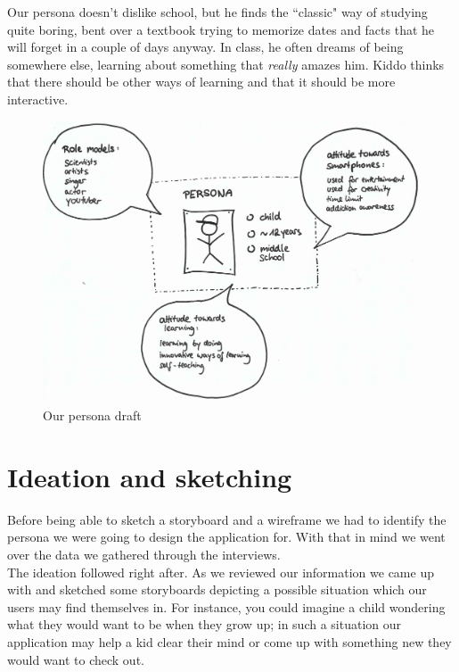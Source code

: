 \documentclass[12pt]{scrartcl}
\begin{document}
	Our persona doesn't dislike school, but he finds the ``classic" way of studying quite boring, bent over a textbook trying to memorize 
	dates and facts that he will forget in a couple of days anyway. In class, he often dreams of being somewhere else, learning 
	about something that \textit{really} amazes him. Kiddo thinks that there should be other ways of learning and that it should be
	more interactive.\\	
	
	\begin{figure}[H]
        		\centering
       		\includegraphics[width=\textwidth]{../images/persona2.jpg}
       		\caption{Our persona draft}
        		\label{persona1}
	\end{figure}
	

\section{Ideation and sketching}

	Before being able to sketch a storyboard and a wireframe we had to identify the persona we 
	were going to design the application for. With that in mind we went over the data we gathered
	through the interviews.\\
	
	The ideation followed right after. As we reviewed our information we came up with and sketched 
	some storyboards depicting a possible situation which our users may find themselves in. 
	For instance, you could imagine a child wondering what they would want to be when they grow
	up; in such a situation our application may help a kid clear their mind or come up with something
	new they would want to check out.\\
	
\end{document}
